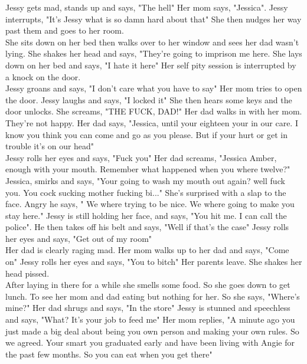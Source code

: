 \documentclass{article}[12px]
\begin{document}
	Jessy gets mad, stands up and says, "The hell" Her mom says, "Jessica". Jessy interrupts, "It's Jessy what is so damn hard about that" She then nudges her way past them and goes to her room.\\
	
	She sits down on her bed then walks over to her window and sees her dad wasn't lying. She shakes her head and says, "They're going to imprison me here. She lays down on her bed and says, "I hate it here" Her self pity session is interrupted by a knock on the door.\\
	
	Jessy groans and says, "I don't care what you have to say" Her mom tries to open the door. Jessy laughs and says, "I locked it" She then hears some keys and the door unlocks. She screams, "THE FUCK, DAD!" Her dad walks in with her mom. They're not happy. Her dad says, "Jessica, until your eighteen your in our care. I know you think you can come and go as you please. But if your hurt or get in trouble it's on our head"\\
	
	Jessy rolls her eyes and says, "Fuck you" Her dad screams, "Jessica Amber, enough with your mouth. Remember what happened when you where twelve?" Jessica, smirks and says, "Your going to wash my mouth out again? well fuck you. You cock sucking mother fucking bi..." She's surprised with a slap to the face. Angry he says, " We where trying to be nice. We where going to make you stay here." Jessy is still holding her face, and says, "You hit me. I can call the police". He then takes off his belt and says, "Well if that's the case" Jessy rolls her eyes and says, "Get out of my room" \\
	
	Her dad is clearly raging mad. Her mom walks up to her dad and says, "Come on" Jessy rolls her eyes and says, "You to bitch" Her parents leave. She shakes her head pissed.\\
	
	After laying in there for a while she smells some food. So she goes down to get lunch. To see her mom and dad eating but nothing for her. So she says, "Where's mine?" Her dad shrugs and says, "In the store" Jessy is stunned and speechless and says, "What? It's your job to feed me" Her mom replies, "A minute ago you just made a big deal about being you own person and making your own rules. So we agreed. Your smart you graduated early and have been living with Angie for the past few months. So you can eat when you get there"\\
	
\end{document}
